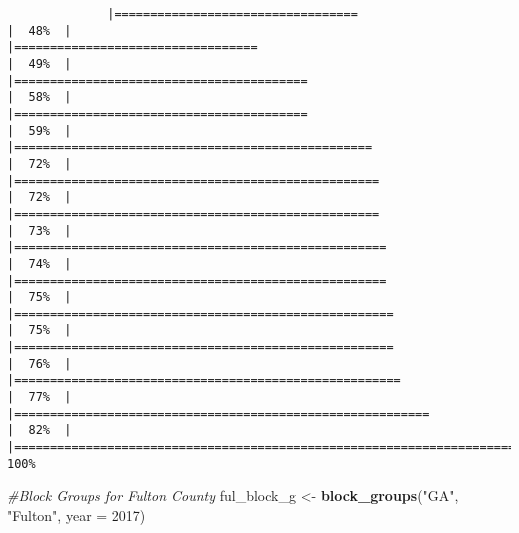 \documentclass[
]{article}
\newenvironment{Shaded}{\begin{snugshade}}{\end{snugshade}}
\newcommand{\AttributeTok}[1]{\textcolor[rgb]{0.13,0.29,0.53}{#1}}
\newcommand{\CommentTok}[1]{\textcolor[rgb]{0.56,0.35,0.01}{\textit{#1}}}
\newcommand{\DecValTok}[1]{\textcolor[rgb]{0.00,0.00,0.81}{#1}}
\newcommand{\FunctionTok}[1]{\textcolor[rgb]{0.13,0.29,0.53}{\textbf{#1}}}
\newcommand{\NormalTok}[1]{#1}
\newcommand{\OtherTok}[1]{\textcolor[rgb]{0.56,0.35,0.01}{#1}}
\newcommand{\StringTok}[1]{\textcolor[rgb]{0.31,0.60,0.02}{#1}}
\begin{document}
\begin{verbatim}
              |==================================                                    |  48%  |                                                                              |==================================                                    |  49%  |                                                                              |=========================================                             |  58%  |                                                                              |=========================================                             |  59%  |                                                                              |==================================================                    |  72%  |                                                                              |===================================================                   |  72%  |                                                                              |===================================================                   |  73%  |                                                                              |====================================================                  |  74%  |                                                                              |====================================================                  |  75%  |                                                                              |=====================================================                 |  75%  |                                                                              |=====================================================                 |  76%  |                                                                              |======================================================                |  77%  |                                                                              |==========================================================            |  82%  |                                                                              |======================================================================| 100%
\end{verbatim}

\begin{Shaded}
\begin{Highlighting}[]
\CommentTok{\#Block Groups for Fulton County}
\NormalTok{ful\_block\_g }\OtherTok{\textless{}{-}} \FunctionTok{block\_groups}\NormalTok{(}\StringTok{"GA"}\NormalTok{, }\StringTok{"Fulton"}\NormalTok{, }\AttributeTok{year =} \DecValTok{2017}\NormalTok{)}
\end{Highlighting}
\end{Shaded}
\end{document}
